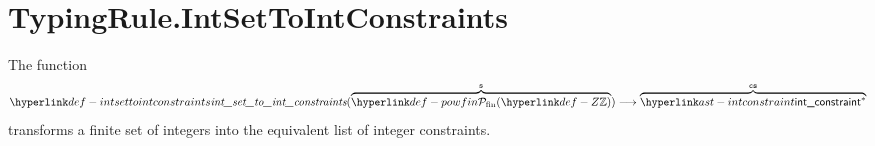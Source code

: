 \begin{mathpar}
\end{mathpar}

\begin{mathpar}
\end{mathpar}

\begin{mathpar}
\end{mathpar}

\section{TypingRule.IntSetToIntConstraints \label{sec:TypingRule.IntSetToIntConstraints}}
\hypertarget{def-intsettointconstraints}{}
The function
\[
\intsettointconstraints(\overname{\powfin{\Z}}{\vs})
\aslto \overname{\intconstraint^*}{\cs}
\]
transforms a finite set of integers into the equivalent list of integer constraints.

